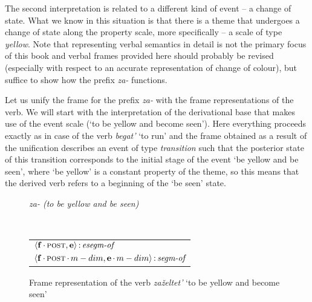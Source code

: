The second interpretation is related to a different kind of event -- a change of state. What we know in this situation is that there is a theme that undergoes a change of state along the property scale, more specifically -- a scale of type \textit{yellow}. Note that representing verbal semantics in detail is not the primary focus of this book and verbal frames provided here should probably be revised (especially with respect to an accurate representation of change of colour), but suffice to show how the prefix \textit{za-}   functions.

Let us unify the frame for the prefix \textit{za-}   with the frame representations of the verb. We will start with the interpretation of the derivational base that makes use of the event scale (`to be yellow and become seen'). Here everything proceeds exactly as in case of the verb \textit{begat'} `to run' and the frame obtained as a result of the unification describes an event of type \textit{transition} such that the posterior state of this transition corresponds to the initial stage of the event `be yellow and be seen', where `be yellow' is a constant property of the theme, so this means that the derived verb refers to a beginning of the `be seen' state.

\begin{figure}
\begin{minipage}[b]{.5\textwidth}\centering
\textit{za- (to be yellow and be seen)}\\
\end{minipage}%
\begin{minipage}[b]{.5\textwidth}\centering
{}
\end{minipage}\medskip\\
\begin{tabular}[t]{l}
$\langle{\textbf{\textrm{f}}\,{\cdot}\,\textsc{post},\textbf{\textrm{e}}}\rangle\,{:}\,\textit{esegm-of}$\\[1ex]
$\tuple{\btag{f}\BC\POST\C\MDIM,\btag{e}\BC\MDIM}\D\type{segm-of}$\\
\end{tabular}
\caption{Frame representation of the verb \textit{za\v{z}eltet'} `to be yellow and become seen' \label{frame:zazeltet:seen}}
\end{figure}

